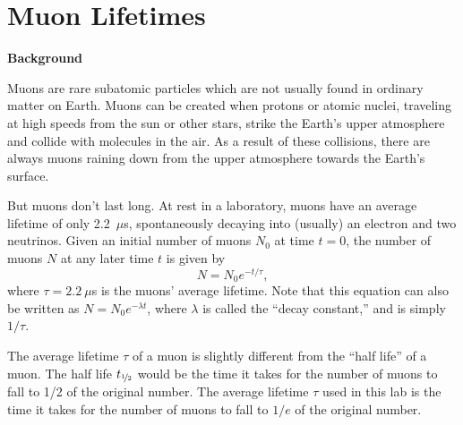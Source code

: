 \section{Muon Lifetimes}


\makelabheader %

\bigskip

\textbf{Background} 

Muons are rare subatomic particles which are not usually found in ordinary matter on Earth.  Muons can be created when protons or atomic nuclei, traveling at high speeds from the sun or other stars, strike the Earth's upper atmosphere and collide with molecules in the air.  As a result of these collisions, there are always muons raining down from the upper atmosphere towards the Earth's surface.

But muons don't last long.  At rest in a laboratory, muons have an average lifetime of only 2.2~$\mu$s, spontaneously decaying into (usually) an electron and two neutrinos.  Given an initial number of muons $N_0$ at time $t=0$, the number of muons $N$ at any later time $t$ is given by
\begin{equation}
N=N_0 e^{-t/\tau},
\end{equation}
where $\tau = 2.2~\mu$s is the muons' average lifetime.  Note that this equation can also be written as $N=N_0 e^{-\lambda t}$, where $\lambda$ is called the ``decay constant,'' and is simply $1/\tau$.  

\providecommand{\halflife}{t_{\rm \nicefrac{1\mkern-1mu}{\mkern-1mu2}}}

The average lifetime $\tau$ of a muon is slightly different from the ``half life'' of a muon.  The half life $\halflife$ would be the time it takes for the number of muons to fall to 1/2 of the original number. The average lifetime $\tau$ used in this lab is the time it takes for the number of muons to fall to $1/e$ of the original number.

